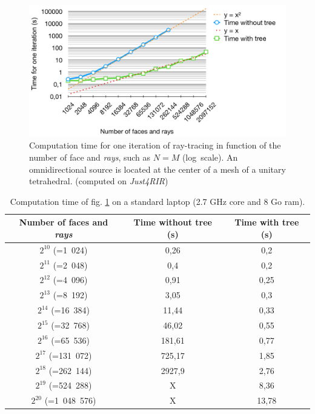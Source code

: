\documentclass[AMA,STIX1COL]{WileyNJD-v2}
\begin{document}
\begin{figure}[t]
\centering
	\includegraphics[width=0.8\linewidth]{times}
	\caption{Computation time for one iteration of ray-tracing in function of the number of face and \textit{rays}, such as $N = M$ (log~scale). An omnidirectional source is located at the center of a mesh of a unitary tetrahedral. (computed on \textit{Just4RIR})}
	\label{times}
\end{figure}
%
\begin{table}[t]
\centering
	\begin{tabular}{| c | c | c |}
		\hline
		Number of faces and \textit{rays} & Time \textbf{without} tree (s) & Time \textbf{with} tree (s)\\
		  \hline
		  \hline
		   $2^{10}$ (=1~024) & 0,26 &	0,2 \\
		   \hline
		$2^{11}$ (=2~048)  & 0,4	& 0,2 \\
		   \hline
		$2^{12}$ (=4~096) & 0,91	& 0,25\\
		   \hline
		$2^{13}$ (=8~192) & 3,05 &	0,3\\
		   \hline
		$2^{14}$ (=16~384) & 11,44	&0,33\\
		   \hline
		$2^{15}$ (=32~768) & 46,02	&0,55 \\
		     \hline
		    $2^{16}$ (=65~536) & 181,61	& 0,77\\
		   \hline
		$2^{17}$ (=131~072) & 725,17	& 1,85\\
		\hline
		$2^{18}$ (=262~144) & 2927,9 & 2,76 \\
		\hline
		$2^{19}$ (=524~288) & X & 8,36 \\
		\hline
		$2^{20}$ (=1~048~576) & X & 13,78 \\
		\hline
	 \end{tabular}
	\caption{Computation time of fig. \ref{times} on a standard laptop (2.7 GHz core and 8 Go ram).}
	\label{tabComplexite}
\end{table}
\end{document}
